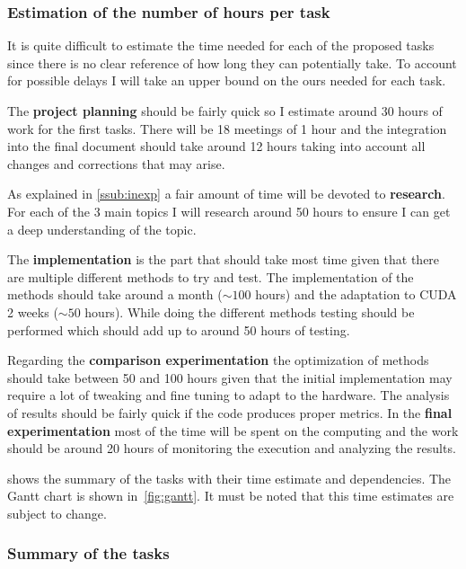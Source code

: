 \subsubsection{Estimation of the number of hours per task}

It is quite difficult to estimate the time needed for each of the proposed tasks
since there is no clear reference of how long they can potentially take. To
account for possible delays I will take an upper bound on the ours needed for
each task.

The \textbf{project planning} should be fairly quick so I estimate around 30
hours of work for the first tasks. There will be 18 meetings of 1 hour and the
integration into the final document should take around 12 hours taking into
account all changes and corrections that may arise.

As explained in \cref{ssub:inexp} a fair amount of time will be devoted to
\textbf{research}. For each of the 3 main topics I will research around 50 hours
to ensure I can get a deep understanding of the topic.

The \textbf{implementation} is the part that should take most time given that
there are multiple different methods to try and test. The implementation of the
methods should take around a month ($\sim100$ hours) and the adaptation to CUDA 2
weeks ($\sim 50$ hours). While doing the different methods testing should be performed
which should add up to around 50 hours of testing.

Regarding the \textbf{comparison experimentation} the optimization of methods
should take between 50 and 100 hours given that the initial implementation may
require a lot of tweaking and fine tuning to adapt to the hardware. The analysis
of results should be fairly quick if the code produces proper metrics. In the
\textbf{final experimentation} most of the time will be spent on the computing
and the work should be around 20 hours of monitoring the execution and analyzing
the results.

 shows the summary of the tasks with their time estimate
and dependencies. The Gantt chart is shown in~\cref{fig:gantt}. It must be noted
that this time estimates are subject to change.

\subsubsection{Summary of the tasks}

